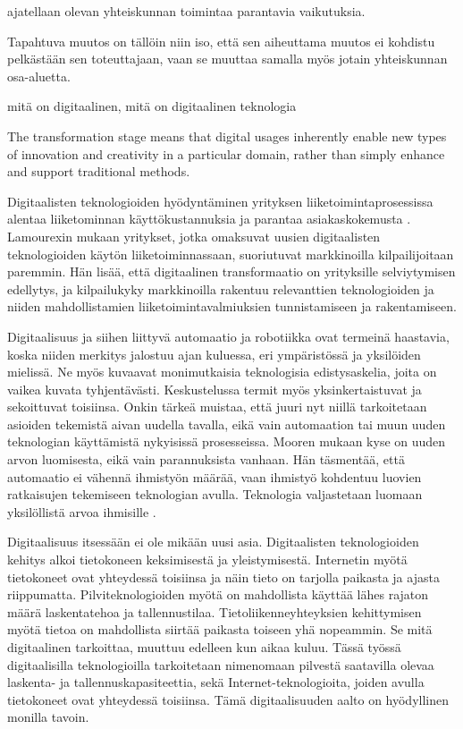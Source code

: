 \documentclass[finnish,12pt,a4paper,pdftex]{article}
\begin{document}
ajatellaan olevan yhteiskunnan toimintaa parantavia vaikutuksia.

Tapahtuva muutos on tällöin niin iso, että sen aiheuttama muutos ei kohdistu pelkästään sen toteuttajaan, vaan se muuttaa samalla myös jotain yhteiskunnan osa-aluetta.


mitä on digitaalinen, mitä on digitaalinen teknologia


The transformation stage means that digital usages inherently enable new types of innovation and creativity in a particular domain, rather than simply enhance and support traditional methods.


Digitaalisten teknologioiden hyödyntäminen yrityksen liiketoimintaprosessissa alentaa liiketominnan käyttökustannuksia ja parantaa asiakaskokemusta  \citep{lamoureux, jungner}. Lamourexin mukaan yritykset, jotka omaksuvat uusien digitaalisten teknologioiden käytön liiketoiminnassaan, suoriutuvat markkinoilla kilpailijoitaan paremmin. Hän lisää, että digitaalinen transformaatio on yrityksille selviytymisen edellytys, ja kilpailukyky markkinoilla rakentuu relevanttien teknologioiden ja niiden mahdollistamien liiketoimintavalmiuksien tunnistamiseen ja rakentamiseen. 

Digitaalisuus ja siihen liittyvä automaatio ja robotiikka ovat termeinä haastavia, koska niiden merkitys jalostuu ajan kuluessa, eri ympäristössä ja yksilöiden mielissä. Ne myös kuvaavat monimutkaisia teknologisia edistysaskelia, joita on vaikea kuvata tyhjentävästi. Keskustelussa termit myös yksinkertaistuvat ja sekoittuvat toisiinsa. Onkin tärkeä muistaa, että juuri nyt niillä tarkoitetaan asioiden tekemistä aivan uudella tavalla, eikä vain automaation tai muun uuden teknologian käyttämistä nykyisissä prosesseissa. Mooren \citeyearpar{susanmoore} mukaan kyse on uuden arvon luomisesta, eikä vain parannuksista vanhaan. Hän täsmentää, että automaatio ei vähennä ihmistyön määrää, vaan ihmistyö kohdentuu luovien ratkaisujen tekemiseen teknologian avulla. Teknologia valjastetaan luomaan yksilöllistä arvoa ihmisille \citep{jungner, susanmoore}.

Digitaalisuus itsessään ei ole mikään uusi asia. Digitaalisten teknologioiden kehitys alkoi tietokoneen keksimisestä ja yleistymisestä. Internetin myötä tietokoneet ovat yhteydessä toisiinsa ja näin tieto on tarjolla paikasta ja ajasta riippumatta. Pilviteknologioiden myötä on mahdollista käyttää lähes rajaton määrä laskentatehoa ja tallennustilaa. Tietoliikenneyhteyksien kehittymisen myötä tietoa on mahdollista siirtää paikasta toiseen yhä nopeammin. Se mitä digitaalinen tarkoittaa, muuttuu edelleen kun aikaa kuluu. Tässä työssä digitaalisilla teknologioilla tarkoitetaan nimenomaan pilvestä saatavilla olevaa laskenta- ja tallennuskapasiteettia, sekä Internet-teknologioita, joiden avulla tietokoneet ovat yhteydessä toisiinsa. Tämä digitaalisuuden aalto on hyödyllinen monilla tavoin. 
\end{document}
